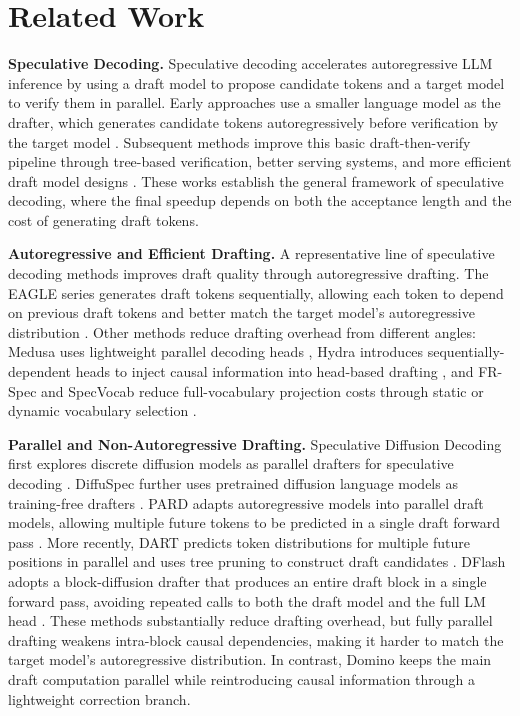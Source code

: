 \documentclass{llmxive}
\begin{document}
\section{Related Work}
\noindent\textbf{Speculative Decoding.}
Speculative decoding accelerates autoregressive LLM inference by using a draft model to propose candidate tokens and a target model to verify them in parallel. Early approaches use a smaller language model as the drafter, which generates candidate tokens autoregressively before verification by the target model \citep{leviathan2023fast, chen2023accelerating}. Subsequent methods improve this basic draft-then-verify pipeline through tree-based verification, better serving systems, and more efficient draft model designs \citep{miao2023specinfer, cai2024medusa, li2024eagle}. These works establish the general framework of speculative decoding, where the final speedup depends on both the acceptance length and the cost of generating draft tokens.

\noindent\textbf{Autoregressive and Efficient Drafting.}
A representative line of speculative decoding methods improves draft quality through autoregressive drafting. The EAGLE series generates draft tokens sequentially, allowing each token to depend on previous draft tokens and better match the target model's autoregressive distribution \citep{li2024eagle, li2024eagle2, li2025eagle3}. Other methods reduce drafting overhead from different angles: Medusa uses lightweight parallel decoding heads \citep{cai2024medusa}, Hydra introduces sequentially-dependent heads to inject causal information into head-based drafting \citep{ankner2024hydra}, and FR-Spec and SpecVocab reduce full-vocabulary projection costs through static or dynamic vocabulary selection \citep{zhao2025fr,williams2026speculative}. 

\noindent\textbf{Parallel and Non-Autoregressive Drafting.}
Speculative Diffusion Decoding first explores discrete diffusion models as parallel drafters for speculative decoding \citep{christopher2025speculative}. DiffuSpec further uses pretrained diffusion language models as training-free drafters \citep{li2025diffuspec}. PARD adapts autoregressive models into parallel draft models, allowing multiple future tokens to be predicted in a single draft forward pass \citep{an2026pard}.  More recently, DART predicts token distributions for multiple future positions in parallel and uses  tree pruning to construct draft candidates \citep{liu2026dart}. DFlash adopts a block-diffusion drafter that produces an entire draft block in a single forward pass, avoiding repeated calls to both the draft model and the full LM head \citep{chen2026dflash}. These methods substantially reduce drafting overhead, but fully parallel drafting weakens intra-block causal dependencies, making it harder to match the target model's autoregressive distribution. In contrast, Domino keeps the main draft computation parallel while reintroducing causal information through a lightweight correction branch.
\end{document}
